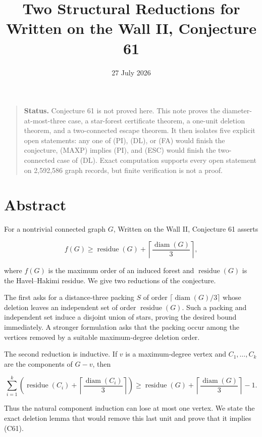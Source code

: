 \documentclass[
  11pt,
  letterpaper,
]{article}
\title{Two Structural Reductions for Written on the Wall II, Conjecture
61}
\author{}
\date{27 July 2026}
\begin{document}
\maketitle

\begin{quote}
\textbf{Status.} Conjecture 61 is not proved here. This note proves the
diameter-at-most-three case, a star-forest certificate theorem, a
one-unit deletion theorem, and a two-connected escape theorem. It then
isolates five explicit open statements: any one of (PI), (DL), or (FA)
would finish the conjecture, (MAXP) implies (PI), and (ESC) would finish
the two-connected case of (DL). Exact computation supports every open
statement on 2,592,586 graph records, but finite verification is not a
proof.
\end{quote}

\section{Abstract}\label{abstract}

For a nontrivial connected graph \(G\), Written on the Wall II,
Conjecture 61 asserts

\[
f(G)\ge
\operatorname{residue}(G)
+\left\lceil\frac{\operatorname{diam}(G)}3\right\rceil,
\tag{C61}
\]

where \(f(G)\) is the maximum order of an induced forest and
\(\operatorname{residue}(G)\) is the Havel--Hakimi residue. We give two
reductions of the conjecture.

The first asks for a distance-three packing \(S\) of order
\(\lceil\operatorname{diam}(G)/3\rceil\) whose deletion leaves an
independent set of order \(\operatorname{residue}(G)\). Such a packing
and independent set induce a disjoint union of stars, proving the
desired bound immediately. A stronger formulation asks that the packing
occur among the vertices removed by a suitable maximum-degree deletion
order.

The second reduction is inductive. If \(v\) is a maximum-degree vertex
and \(C_1,\ldots,C_k\) are the components of \(G-v\), then

\[
\sum_{i=1}^k
\left(
  \operatorname{residue}(C_i)
  +\left\lceil\frac{\operatorname{diam}(C_i)}3\right\rceil
\right)
\ge
\operatorname{residue}(G)
+\left\lceil\frac{\operatorname{diam}(G)}3\right\rceil-1.
\]

Thus the natural component induction can lose at most one vertex. We
state the exact deletion lemma that would remove this last unit and
prove that it implies (C61).
\end{document}
